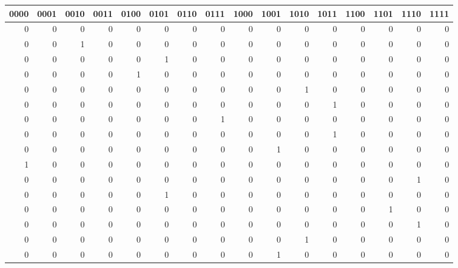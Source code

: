 \begin{tabular}{rrrrrrrrrrrrrrrr}
\hline
   0000 &   0001 &   0010 &   0011 &   0100 &   0101 &   0110 &   0111 &   1000 &   1001 &   1010 &   1011 &   1100 &   1101 &   1110 &   1111 \\
\hline
      0 &      0 &      0 &      0 &      0 &      0 &      0 &      0 &      0 &      0 &      0 &      0 &      0 &      0 &      0 &      0 \\
      0 &      0 &      1 &      0 &      0 &      0 &      0 &      0 &      0 &      0 &      0 &      0 &      0 &      0 &      0 &      0 \\
      0 &      0 &      0 &      0 &      0 &      1 &      0 &      0 &      0 &      0 &      0 &      0 &      0 &      0 &      0 &      0 \\
      0 &      0 &      0 &      0 &      1 &      0 &      0 &      0 &      0 &      0 &      0 &      0 &      0 &      0 &      0 &      0 \\
      0 &      0 &      0 &      0 &      0 &      0 &      0 &      0 &      0 &      0 &      1 &      0 &      0 &      0 &      0 &      0 \\
      0 &      0 &      0 &      0 &      0 &      0 &      0 &      0 &      0 &      0 &      0 &      1 &      0 &      0 &      0 &      0 \\
      0 &      0 &      0 &      0 &      0 &      0 &      0 &      1 &      0 &      0 &      0 &      0 &      0 &      0 &      0 &      0 \\
      0 &      0 &      0 &      0 &      0 &      0 &      0 &      0 &      0 &      0 &      0 &      1 &      0 &      0 &      0 &      0 \\
      0 &      0 &      0 &      0 &      0 &      0 &      0 &      0 &      0 &      1 &      0 &      0 &      0 &      0 &      0 &      0 \\
      1 &      0 &      0 &      0 &      0 &      0 &      0 &      0 &      0 &      0 &      0 &      0 &      0 &      0 &      0 &      0 \\
      0 &      0 &      0 &      0 &      0 &      0 &      0 &      0 &      0 &      0 &      0 &      0 &      0 &      0 &      1 &      0 \\
      0 &      0 &      0 &      0 &      0 &      1 &      0 &      0 &      0 &      0 &      0 &      0 &      0 &      0 &      0 &      0 \\
      0 &      0 &      0 &      0 &      0 &      0 &      0 &      0 &      0 &      0 &      0 &      0 &      0 &      1 &      0 &      0 \\
      0 &      0 &      0 &      0 &      0 &      0 &      0 &      0 &      0 &      0 &      0 &      0 &      0 &      0 &      1 &      0 \\
      0 &      0 &      0 &      0 &      0 &      0 &      0 &      0 &      0 &      0 &      1 &      0 &      0 &      0 &      0 &      0 \\
      0 &      0 &      0 &      0 &      0 &      0 &      0 &      0 &      0 &      1 &      0 &      0 &      0 &      0 &      0 &      0 \\
\hline
\end{tabular}
